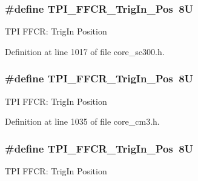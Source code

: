 \subsubsection[{\texorpdfstring{T\+P\+I\+\_\+\+F\+F\+C\+R\+\_\+\+Trig\+In\+\_\+\+Pos}{TPI_FFCR_TrigIn_Pos}}]{\setlength{\rightskip}{0pt plus 5cm}\#define T\+P\+I\+\_\+\+F\+F\+C\+R\+\_\+\+Trig\+In\+\_\+\+Pos~8U}\hypertarget{group___c_m_s_i_s___t_p_i_gaa7ea11ba6ea75b541cd82e185c725b5b}{}\label{group___c_m_s_i_s___t_p_i_gaa7ea11ba6ea75b541cd82e185c725b5b}
T\+PI F\+F\+CR\+: Trig\+In Position 

Definition at line 1017 of file core\+\_\+sc300.\+h.

\subsubsection[{\texorpdfstring{T\+P\+I\+\_\+\+F\+F\+C\+R\+\_\+\+Trig\+In\+\_\+\+Pos}{TPI_FFCR_TrigIn_Pos}}]{\setlength{\rightskip}{0pt plus 5cm}\#define T\+P\+I\+\_\+\+F\+F\+C\+R\+\_\+\+Trig\+In\+\_\+\+Pos~8U}\hypertarget{group___c_m_s_i_s___t_p_i_gaa7ea11ba6ea75b541cd82e185c725b5b}{}\label{group___c_m_s_i_s___t_p_i_gaa7ea11ba6ea75b541cd82e185c725b5b}
T\+PI F\+F\+CR\+: Trig\+In Position 

Definition at line 1035 of file core\+\_\+cm3.\+h.

\subsubsection[{\texorpdfstring{T\+P\+I\+\_\+\+F\+F\+C\+R\+\_\+\+Trig\+In\+\_\+\+Pos}{TPI_FFCR_TrigIn_Pos}}]{\setlength{\rightskip}{0pt plus 5cm}\#define T\+P\+I\+\_\+\+F\+F\+C\+R\+\_\+\+Trig\+In\+\_\+\+Pos~8U}\hypertarget{group___c_m_s_i_s___t_p_i_gaa7ea11ba6ea75b541cd82e185c725b5b}{}\label{group___c_m_s_i_s___t_p_i_gaa7ea11ba6ea75b541cd82e185c725b5b}
T\+PI F\+F\+CR\+: Trig\+In Position 

